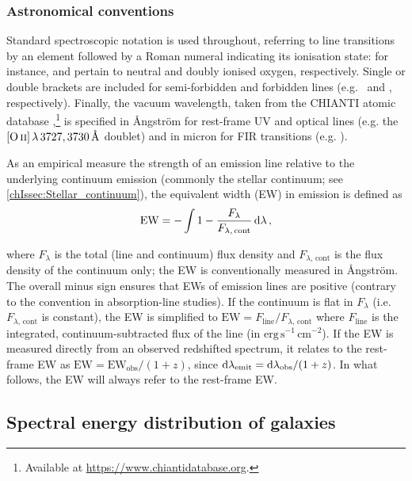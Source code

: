 \subsubsection{Astronomical conventions}
\label{chIsssec:Astronomical_conventions}

Standard spectroscopic notation is used throughout, referring to line transitions by an element followed by a Roman numeral indicating its ionisation state: for instance,  and  pertain to neutral and doubly ionised oxygen, respectively. Single or double brackets are included for semi-forbidden and forbidden lines (e.g. \CIIIs\ and \OIIIf, respectively). Finally, the vacuum wavelength, taken from the CHIANTI atomic database \citep{1997A&AS..125..149D, 2021ApJ...909...38D},\footnote{Available at \url{https://www.chiantidatabase.org}.} is specified in {\AA}ngstr{\"o}m for rest-frame UV and optical lines (e.g. the $\OII \, \lambda \, 3727, 3730 \, \Angstrom$ doublet) and in micron for FIR transitions (e.g. \CIILam).

As an empirical measure the strength of an emission line relative to the underlying continuum emission (commonly the stellar continuum; see \cref{chIssec:Stellar_continuum}), the equivalent width (EW) in emission is defined as
\begin{equation}
\label{chIeq:Equivalent_width}
\text{EW} = - \int 1 - \frac{F_\lambda}{F_{\lambda, \, \text{cont}}} \dif \lambda \, ,
\end{equation}

\noindent where $F_\lambda$ is the total (line and continuum) flux density and $F_{\lambda, \, \text{cont}}$ is the flux density of the continuum only; the EW is conventionally measured in {\AA}ngstr{\"o}m. The overall minus sign ensures that EWs of emission lines are positive (contrary to the convention in absorption-line studies). If the continuum is flat in $F_\lambda$ (i.e. $F_{\lambda, \, \text{cont}}$ is constant), the EW is simplified to $\text{EW} = F_\text{line}/F_{\lambda, \, \text{cont}}$ where $F_\text{line}$ is the integrated, continuum-subtracted flux of the line (in $\mathrm{erg \, s^{-1} \, cm^{-2}}$). If the EW is measured directly from an observed redshifted spectrum, it relates to the rest-frame EW as $\text{EW} = \text{EW}_\text{obs}/(1+z)$, since $\dif \lambda_\text{emit} = \dif \lambda_\text{obs}/(1+z)$. In what follows, the EW will always refer to the rest-frame EW.

\subsection{Spectral energy distribution of galaxies}
\label{chIssec:Spectral_energy_distribution_of_galaxies}

